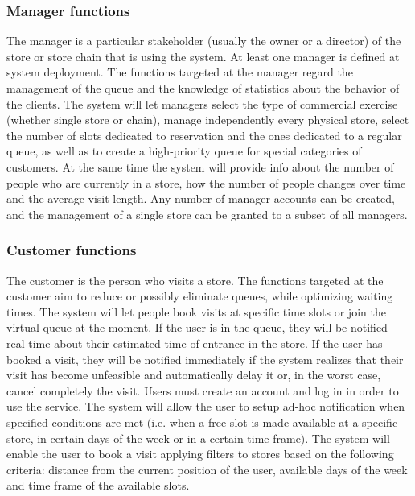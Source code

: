 \subsubsection{Manager functions}
The manager is a particular stakeholder (usually the owner or a director) of the store or store chain that is using the system.
At least one manager is defined at system deployment.
The functions targeted at the manager regard the management of the queue and the knowledge of statistics about the behavior of the clients.
The system will let managers select the type of commercial exercise (whether single store or chain), manage independently every physical store, select the number of slots dedicated to reservation and the ones dedicated to a regular queue, as well as to create a high-priority queue for special categories of customers.
At the same time the system will provide info about the number of people who are currently in a store, how the number of people changes over time and the average visit length.
Any number of manager accounts can be created, and the management of a single store can be granted to a subset of all managers.

\subsubsection{Customer functions}
The customer is the person who visits a store.
The functions targeted at the customer aim to reduce or possibly eliminate queues, while optimizing waiting times.
The system will let people book visits at specific time slots or join the virtual queue at the moment.
If the user is in the queue, they will be notified real-time about their estimated time of entrance in the store.
If the user has booked a visit, they will be notified immediately if the system realizes that their visit has become unfeasible and automatically delay it or, in the worst case, cancel completely the visit.
Users must create an account and log in in order to use the service.
The system will allow the user to setup ad-hoc notification when specified conditions are met (i.e. when a free slot is made available at a specific store, in certain days of the week or in a certain time frame).
The system will enable the user to book a visit applying filters to stores based on the following criteria: distance from the current position of the user, available days of the week and time frame of the available slots.  

